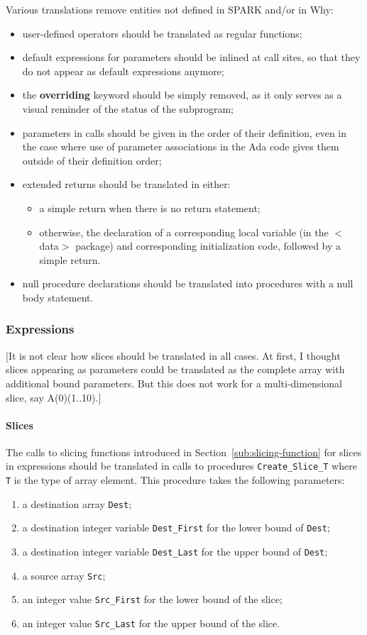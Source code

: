 \documentclass{article}
\newcommand{\kw}[1]{\textbf{#1}}
\begin{document}
Various translations remove entities not defined in SPARK and/or in Why:
\begin{itemize}
\item user-defined operators should be translated as regular functions;
\item default expressions for parameters should be inlined at call sites, so
  that they do not appear as default expressions anymore;
\item the \kw{overriding} keyword should be simply removed, as it only serves
  as a visual reminder of the status of the subprogram;
\item parameters in calls should be given in the order of their definition,
  even in the case where use of parameter associations in the Ada code gives
  them outside of their definition order;
\item extended returns should be translated in either:
  \begin{itemize}
  \item a simple return when there is no return statement;
  \item otherwise, the declaration of a corresponding local variable (in the
    $<$data$>$ package) and corresponding initialization code, followed by a
    simple return.
  \end{itemize}
\item null procedure declarations should be translated into procedures with a
  null body statement.
\end{itemize}

\subsubsection{Expressions}

[It is not clear how slices should be translated in all cases. At first, I
thought slices appearing as parameters could be translated as the complete
array with additional bound parameters. But this does not work for a
multi-dimensional slice, say A(0)(1..10).]

\paragraph{Slices}

The calls to slicing functions introduced in Section~\ref{sub:slicing-function}
for slices in expressions should be translated in calls to procedures
\verb|Create_Slice_T| where \verb|T| is the type of array element. This
procedure takes the following parameters:
\begin{enumerate}
\item a destination array \verb|Dest|;
\item a destination integer variable \verb|Dest_First| for the lower bound of
  \verb|Dest|;
\item a destination integer variable \verb|Dest_Last| for the upper bound of
  \verb|Dest|;
\item a source array \verb|Src|;
\item an integer value \verb|Src_First| for the lower bound of the slice;
\item an integer value \verb|Src_Last| for the upper bound of the slice.
\end{enumerate}
\end{document}
